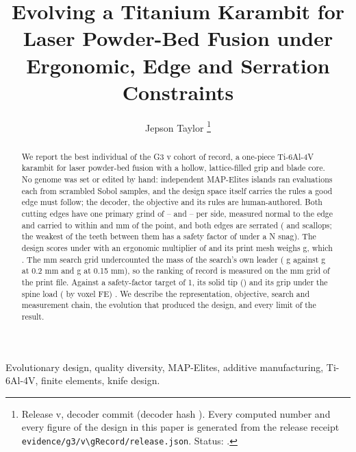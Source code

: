 \documentclass[10pt,journal,letterpaper]{IEEEtran}
\DeclareRobustCommand{\code}[1]{\texorpdfstring{{\nolinkurl{#1}}}{#1}}
\begin{document}
\title{Evolving a Titanium Karambit for Laser Powder-Bed Fusion under Ergonomic, Edge and Serration Constraints}
\author{Jepson Taylor%
\thanks{Release v\gVersion, decoder commit \gCommit{} (decoder hash \gDecoder). Every computed number and every figure of the design in this
paper is generated from the release receipt \code{evidence/g3/v\gRecord/release.json}. Status: \gStatus.}}
\maketitle

\begin{abstract}
We report the best individual of the G3 v\gRecord{} cohort of record, a one-piece Ti-6Al-4V karambit for laser
powder-bed fusion with a hollow, lattice-filled grip and blade core. No genome was set or edited by hand: \gIslands{} independent
MAP-Elites islands ran \gEvalsIsland{} evaluations each from scrambled Sobol samples, and the design space itself
carries the rules a good edge must follow; the decoder, the objective and its rules are human-authored. Both cutting edges have one primary grind of
\gEdgeAApexLo--\gEdgeAApexHi\textdegree{} and \gEdgeBApexLo--\gEdgeBApexHi\textdegree{} per side, measured normal to
the edge and carried to within \gEdgeATo{} and \gEdgeBTo{} mm of the point, and both edges are serrated
(\gEdgeATeeth{} and \gEdgeBTeeth{} scallops; the weakest of the teeth between them has a safety factor of
\gToothMin{} under a \gToothSnag{} N snag). The design scores \gScore{} under \gMetric{} with an ergonomic multiplier of \gE{} and
its print mesh weighs \gMassG{} g, which \gMassReading. The \gH{} mm search grid undercounted the mass of the
search's own leader (\gLeaderMassA{} g against \gLeaderMassB{} g at 0.2 mm and \gLeaderMassC{} g at 0.15 mm), so the
ranking of record is measured on
the \gHRank{} mm grid of the print file. Against a safety-factor target of 1, its solid tip
(\gTipSF) \gTipReading{} and its grip under the spine load (\gFeGripSpine{} by voxel FE) \gGripReading. We describe
the representation, objective, search and measurement chain, the evolution that produced the design, and every limit
of the result.
\end{abstract}

\begin{IEEEkeywords}
Evolutionary design, quality diversity, MAP-Elites, additive manufacturing, Ti-6Al-4V, finite elements, knife design.
\end{IEEEkeywords}










\end{document}
